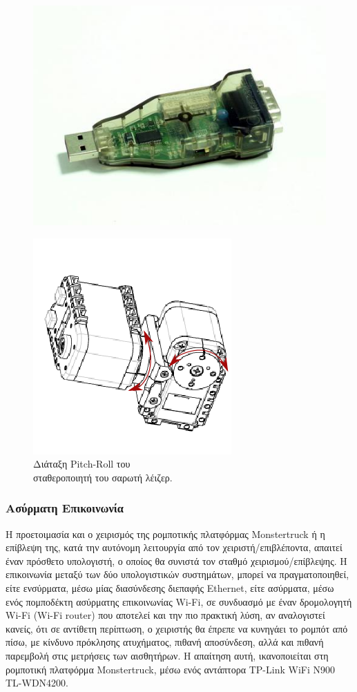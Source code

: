 \begin{figure}[!ht]
	\begin{minipage}[t]{.49\textwidth}
 	\centering
		\includegraphics[width=0.6\linewidth]{Chapters/Chapter2/Figures/usb2dynamixel.jpg}
		\label{fig:usb2dynamixel}
	\end{minipage}
	\begin{minipage}[t]{.5\textwidth}		
		\centering
		\includegraphics[width=0.5\linewidth]{Chapters/Chapter2/Figures/pitch_roll_dxl.png}
		\caption{Διάταξη Pitch-Roll του\\ σταθεροποιητή του σαρωτή λέιζερ.}
		\label{fig:pitch_roll_dxl}
	\end{minipage}
\end{figure}

\bigskip
\subsubsection{Ασύρματη Επικοινωνία} \label{sssec:wireless_communication}
Η προετοιμασία και ο χειρισμός της ρομποτικής πλατφόρμας {Monstertruck} ή η επίβλεψη της, κατά την αυτόνομη λειτουργία από τον χειριστή/επιβλέποντα, απαιτεί έναν πρόσθετο υπολογιστή, ο οποίος θα συνιστά τον {σταθμό χειρισμού/επίβλεψης}. Η επικοινωνία μεταξύ των δύο υπολογιστικών συστημάτων, μπορεί να πραγματοποιηθεί, είτε ενσύρματα, μέσω μίας διασύνδεσης διεπαφής {Ethernet}, είτε ασύρματα, μέσω ενός πομποδέκτη ασύρματης επικοινωνίας {Wi-Fi}, σε συνδυασμό με έναν {δρομολογητή Wi-Fi (Wi-Fi router)} που αποτελεί και την πιο πρακτική λύση, αν αναλογιστεί κανείς, ότι σε αντίθετη περίπτωση, ο χειριστής θα έπρεπε να κυνηγάει το ρομπότ από πίσω, με κίνδυνο πρόκλησης ατυχήματος, πιθανή αποσύνδεση, αλλά και πιθανή παρεμβολή στις μετρήσεις των αισθητήρων. H απαίτηση αυτή, ικανοποιείται στη ρομποτική πλατφόρμα {Monstertruck}, μέσω ενός αντάπτορα {TP-Link WiFi N900 TL-WDN4200}.

